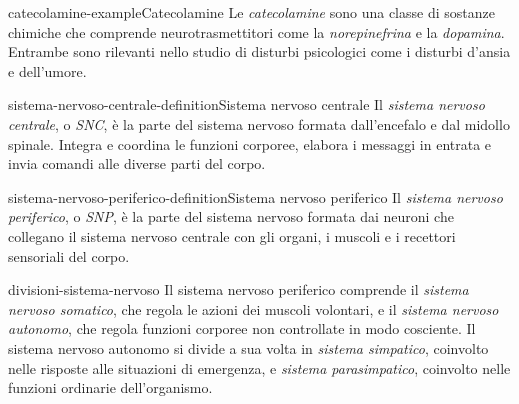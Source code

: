 \documentclass[preview]{standalone}
\begin{document}
\begin{snippetexample}{catecolamine-example}{Catecolamine}
    Le \emph{catecolamine} sono una classe di sostanze chimiche che comprende
    neurotrasmettitori come la \emph{norepinefrina} e la \emph{dopamina}.
    Entrambe sono rilevanti nello studio di disturbi psicologici come i
    disturbi d'ansia e dell'umore.
\end{snippetexample}

\begin{snippetdefinition}{sistema-nervoso-centrale-definition}{Sistema nervoso centrale}
    Il \emph{sistema nervoso centrale}, o \emph{SNC}, è la parte del sistema
    nervoso formata dall'encefalo e dal midollo spinale. Integra e coordina le
    funzioni corporee, elabora i messaggi in entrata e invia comandi alle
    diverse parti del corpo.
\end{snippetdefinition}

\begin{snippetdefinition}{sistema-nervoso-periferico-definition}{Sistema nervoso periferico}
    Il \emph{sistema nervoso periferico}, o \emph{SNP}, è la parte del sistema
    nervoso formata dai neuroni che collegano il sistema nervoso centrale con
    gli organi, i muscoli e i recettori sensoriali del corpo.
\end{snippetdefinition}

\begin{snippet}{divisioni-sistema-nervoso}
    Il sistema nervoso periferico comprende il \emph{sistema nervoso somatico},
    che regola le azioni dei muscoli volontari, e il \emph{sistema nervoso
    autonomo}, che regola funzioni corporee non controllate in modo cosciente.
    Il sistema nervoso autonomo si divide a sua volta in \emph{sistema
    simpatico}, coinvolto nelle risposte alle situazioni di emergenza, e
    \emph{sistema parasimpatico}, coinvolto nelle funzioni ordinarie
    dell'organismo.
\end{snippet}

\end{document}
